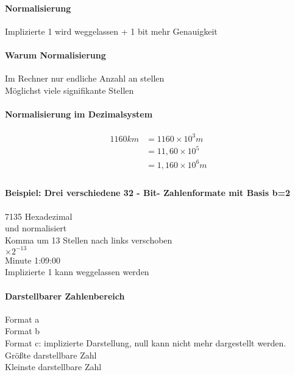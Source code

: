 \documentclass[a4paper]{scrartcl}
\begin{document}
			\paragraph{Normalisierung}
				Implizierte 1 wird weggelassen + 1 bit mehr Genauigkeit\\
			\paragraph{Warum Normalisierung}
				Im Rechner nur endliche Anzahl an stellen\\
				Möglichst viele signifikante Stellen\\
			\paragraph{Normalisierung im Dezimalsystem}
				\begin{align*}
					1160 km &= 1160 \times 10^3 m\\
					&= 11,60 \times 10^5 \\
					&= 1,160 \times 10^6 m  \\ 
				\end{align*}
				
			\paragraph{Beispiel: Drei verschiedene 32 - Bit- Zahlenformate mit Basis b=2}
				7135 Hexadezimal\\
				und normalisiert\\
				Komma um 13 Stellen nach links verschoben\\
				\( \times 2^{-13}\) \\
				Minute 1:09:00\\
				Implizierte 1 kann weggelassen werden\\
				
			\paragraph{Darstellbarer Zahlenbereich}
				Format a\\
				Format b\\
				Format c: implizierte Darstellung, null kann nicht mehr dargestellt werden.\\
				Größte darstellbare Zahl\\
				Kleinste darstellbare Zahl \\
				
\end{document}
